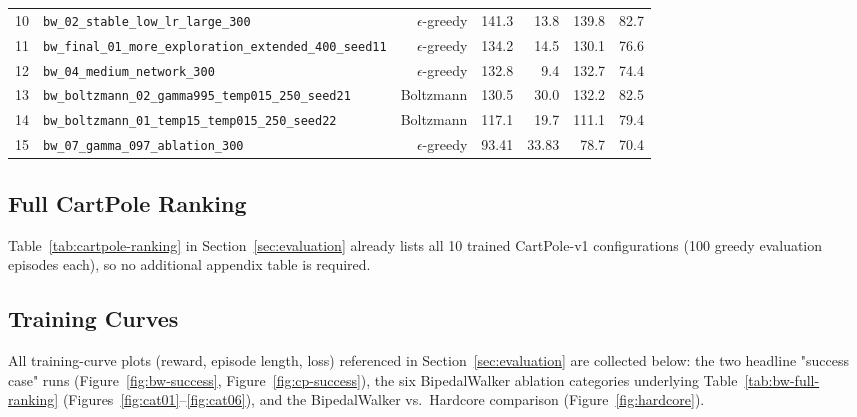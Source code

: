 \begin{table}[h]
\begin{tabular}{rlrrrrr}
        10 & \texttt{bw\_02\_stable\_low\_lr\_large\_300}                     & $\epsilon$-greedy & 141.3  & 13.8  & 139.8  & 82.7 \\
        11 & \texttt{bw\_final\_01\_more\_exploration\_extended\_400\_seed11} & $\epsilon$-greedy & 134.2  & 14.5  & 130.1  & 76.6 \\
        12 & \texttt{bw\_04\_medium\_network\_300}                            & $\epsilon$-greedy & 132.8  & 9.4   & 132.7  & 74.4 \\
        13 & \texttt{bw\_boltzmann\_02\_gamma995\_temp015\_250\_seed21}       & Boltzmann      & 130.5  & 30.0  & 132.2  & 82.5 \\
        14 & \texttt{bw\_boltzmann\_01\_temp15\_temp015\_250\_seed22}         & Boltzmann      & 117.1  & 19.7  & 111.1  & 79.4 \\
        15 & \texttt{bw\_07\_gamma\_097\_ablation\_300}                       & $\epsilon$-greedy & 93.41  & 33.83 & 78.7   & 70.4 \\
        \bottomrule
    \end{tabular}
\end{table}

\subsection{Full CartPole Ranking}

Table~\ref{tab:cartpole-ranking} in Section~\ref{sec:evaluation} already lists all 10 trained CartPole-v1 configurations (100 greedy evaluation episodes each), so no additional appendix table is required.

\clearpage
\subsection{Training Curves}

All training-curve plots (reward, episode length, loss) referenced in Section~\ref{sec:evaluation} are collected below: the two headline "success case" runs (Figure~\ref{fig:bw-success}, Figure~\ref{fig:cp-success}), the six BipedalWalker ablation categories underlying Table~\ref{tab:bw-full-ranking} (Figures~\ref{fig:cat01}--\ref{fig:cat06}), and the BipedalWalker vs.\ Hardcore comparison (Figure~\ref{fig:hardcore}).

